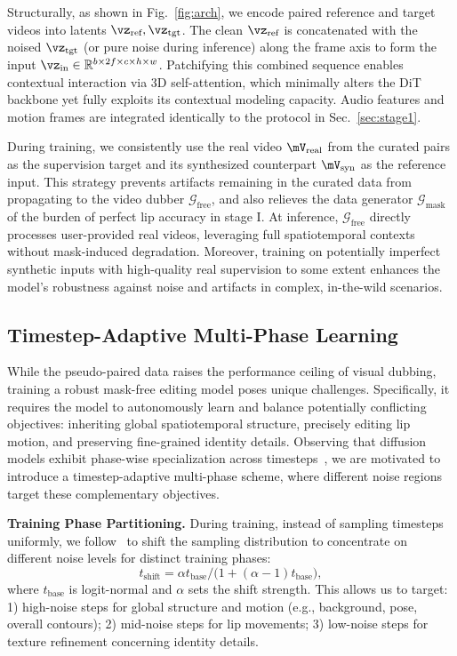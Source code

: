 \documentclass{article}
\newcommand{\myparagraph}[1]{\noindent\textbf{#1}}
\newcommand{\Gmask}{\mathcal{G}_{\text{mask}}}
\newcommand{\Gfree}{\mathcal{G}_{\text{free}}}
\theoremstyle{plain}
\theoremstyle{definition}
\theoremstyle{remark}
\begin{document}
Structurally, as shown in Fig.~\ref{fig:arch}, we encode paired reference and target videos into latents $\vz_{\text{ref}}, \vz_{\text{tgt}}$. 
The clean $\vz_{\text{ref}}$ is concatenated with the noised $\vz_{\text{tgt}}$ (or pure noise during inference) along the frame axis to form the input $\vz_{\text{in}} \in \mathbb{R}^{b \times 2f \times c \times h \times w}$.
Patchifying this combined sequence enables contextual interaction via 3D self-attention, which minimally alters the DiT backbone yet fully exploits its contextual modeling capacity.
Audio features and motion frames are integrated identically to the protocol in Sec.~\ref{sec:stage1}.

During training, we consistently use the real video $\mV_{\text{real}}$ from the curated pairs as the supervision target and its synthesized counterpart $\mV_{\text{syn}}$ as the reference input.
This strategy prevents artifacts remaining in the curated data from propagating to the video dubber $\Gfree$, and also relieves the data generator $\Gmask$ of the burden of perfect lip accuracy in stage I.
At inference, $\mathcal{G}_{\text{free}}$ directly processes user-provided real videos, leveraging full spatiotemporal contexts without mask-induced degradation.
Moreover, training on potentially imperfect synthetic inputs with high-quality real supervision to some extent enhances the model's robustness against noise and artifacts in complex, in-the-wild scenarios.




 

\subsection{Timestep-Adaptive Multi-Phase Learning}
\label{sec:multi_train}
While the pseudo-paired data raises the performance ceiling of visual dubbing, training a robust mask-free editing model poses unique challenges. 
Specifically, it requires the model to autonomously learn and balance potentially conflicting objectives: inheriting global spatiotemporal structure, precisely editing lip motion, and preserving fine-grained identity details. 
Observing that diffusion models exhibit phase-wise specialization across timesteps~\citep{zhang2025flexiact,wang2025fantasytalking2}, we are motivated to introduce a timestep-adaptive multi-phase scheme, where different noise regions target these complementary objectives.

\myparagraph{Training Phase Partitioning.} During training, instead of sampling timesteps uniformly, we follow~\citet{esser2024sd3} to shift the sampling distribution to concentrate on different noise levels for distinct training phases:
\begin{equation}
t_{\text{shift}} = \alpha t_{\text{base}} / \bigl(1 + (\alpha - 1)t_{\text{base}}\bigr),
\label{eq:timeshift}
\end{equation}
where $t_{\text{base}}$ is logit-normal and $\alpha$ sets the shift strength. This allows us to target: 1) high-noise steps for global structure and motion (e.g., background, pose, overall contours); 2) mid-noise steps for lip movements; 3) low-noise steps for texture refinement concerning identity details.
\end{document}
